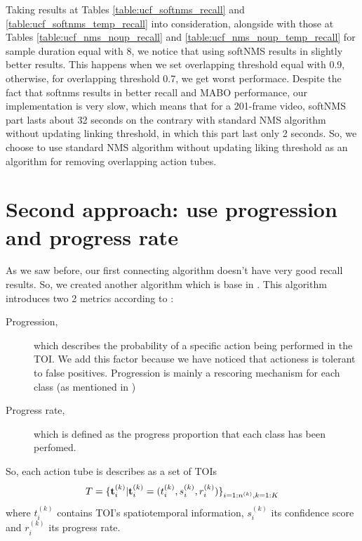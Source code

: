\documentclass{report}
\begin{document}
Taking results at Tables \ref{table:ucf_softnms_recall} and \ref{table:ucf_softnms_temp_recall} into consideration, alongside with those
at Tables \ref{table:ucf_nms_noup_recall} and \ref{table:ucf_nms_noup_temp_recall} for sample duration equal with 8, we notice that
using softNMS results in slightly better results. This happens when we set overlapping threshold equal with 0.9, otherwise, for
overlapping threshold 0.7, we get worst performace. Despite the fact that softnms results in better recall and MABO performance,
our implementation is very slow, which means that for a 201-frame video, softNMS part lasts about 32 seconds on the contrary with
standard NMS algorithm without updating linking threshold, in which this part last only 2 seconds. So, we choose to use standard NMS
algorithm without updating liking threshold as an algorithm for  removing overlapping action tubes.

\section{Second approach: use progression and progress rate}
As we saw before, our first connecting algorithm doesn't have very good recall results. So, we created another algorithm which is base in \cite{DBLP:journals/corr/abs-1903-00304}. This
algorithm introduces two 2 metrics according to \cite{DBLP:journals/corr/abs-1903-00304}:

\begin{description}
\item[ Progression,  ] which describes the probability of a specific action being performed in the TOI. 
  We add this factor because we have noticed that actioness is tolerant to false positives. Progression is
  mainly a rescoring mechanism for each class (as mentioned in \cite{DBLP:journals/corr/abs-1903-00304})

\item [ Progress rate, ] which is defined as the progress proportion that each class has been perfomed.
  
\end{description}

So, each action tube is describes as a set of TOIs
\[  T = {\{ {\bf t}_i^{(k)} | {\bf t}_i^{(k)} = ( t_i^{(k)}, s_i^{(k)}, r_i^{(k)} ) \}}_{i=1:n^{(k)},k=1:K} \]
where $ t_i^{(k)} $ contains TOI's spatiotemporal information, $ s_i^{(k)} $ its confidence score and $ r_i^{(k)} $ its progress rate.
\end{document}
